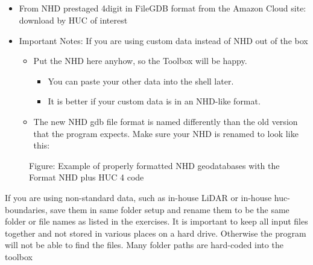 \documentclass[letterpaper,10pt,english]{sphinxmanual}
\begin{document}
\subparagraph{}
\label{\detokenize{ex_1:nhd}}\begin{itemize}
\item {} 
From NHD prestaged 4digit in FileGDB format from the Amazon Cloud site:  download by HUC of interest

\item {} 
Important Notes: If you are using custom data instead of NHD out of the box
\begin{itemize}
\item {} 
Put the NHD here anyhow, so the Toolbox will be happy.
\begin{itemize}
\item {} 
You can paste your other data into the shell later.

\item {} 
It is better if your custom data is in an NHD-like format.

\end{itemize}

\item {} 
The new NHD gdb file format is named differently than the old version that the program expects. Make sure your NHD is renamed to look like this:

\end{itemize}

\end{itemize}

\begin{figure}[htbp]
\centering
\capstart

\noindent{}
\caption{Figure: Example of properly formatted NHD geodatabases with the Format NHD plus HUC 4 code}\label{\detokenize{ex_1:id6}}\end{figure}

If you are using non-standard data, such as in-house LiDAR or in-house huc-boundaries, save them in same folder setup and rename them to be the same folder or file names as listed in the exercises. It is important to keep all input files together and not stored in various places on a hard drive. Otherwise the program will not be able to find the files. Many folder paths are hard-coded into the toolbox


\paragraph{}
\label{\detokenize{ex_1:step-1-setup-archydro-database}}
\end{document}
